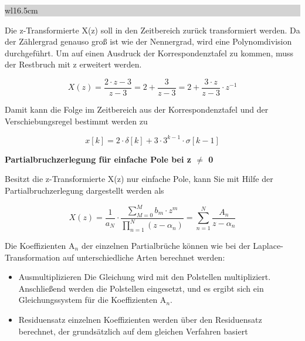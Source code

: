\noindent
\colorbox{lightgray}{%
%
\renewcommand\arraystretch{0.6}%
\begin{tabular}{ wl{16.5cm} }
{}
\end{tabular}%
}\medskip

\noindent Die z-Transformierte X(z) soll in den Zeitbereich zur\"{u}ck transformiert werden. Da der Z\"{a}hlergrad genauso gro{\ss} ist wie der Nennergrad, wird eine Polynomdivision durchgef\"{u}hrt. Um auf einen Ausdruck der Korrespondenztafel zu kommen, muss der Restbruch mit z erweitert werden.

\begin{equation}\label{eq:fiveeightynine}
X\left(z\right)=\frac{2\cdot z-3}{z-3} =2+\frac{3}{z-3} =2+\frac{3\cdot z}{z-3} \cdot z^{-1}
\end{equation}

\noindent Damit kann die Folge im Zeitbereich aus der Korrespondenztafel und der Verschiebungsregel bestimmt werden zu

\begin{equation}\label{eq:fiveninety}
x\left[k\right]=2\cdot \delta \left[k\right]+3\cdot 3^{k-1} \cdot \sigma \left[k-1\right]
\end{equation}

\clearpage

{\selectfont
\noindent\textbf{Partialbruchzerlegung f\"{u}r einfache Pole bei z $\boldsymbol{\mathrm{\neq}}$ 0}}\smallskip

\noindent Besitzt die z-Transformierte X(z) nur einfache Pole, kann Sie mit Hilfe der Partialbruchzerlegung dargestellt werden als

\begin{equation}\label{eq:fiveninetyone}
X\left(z\right)=\frac{1}{a_{N} } \cdot \frac{\sum _{M=0}^{M}b_{m} \cdot z^{m}  }{\prod _{n=1}^{N}\left(z-\alpha _{n} \right) } =\sum _{n=1}^{N}\frac{A_{n} }{z-\alpha _{n} }
\end{equation}

\noindent Die Koeffizienten A${}_{n}$ der einzelnen Partialbr\"{u}che k\"{o}nnen wie bei der Laplace-Transformation auf unterschiedliche Arten berechnet werden:

\begin{itemize}
    \item Ausmultiplizieren \newline
    Die Gleichung wird mit den Polstellen multipliziert. Anschlie{\ss}end werden die Polstellen eingesetzt, und es ergibt sich ein Gleichungssystem f\"{u}r die Koeffizienten A${}_{n}$. 
    \item Residuensatz \newline
    einzelnen Koeffizienten werden \"{u}ber den Residuensatz berechnet, der grunds\"{a}tzlich auf dem gleichen Verfahren basiert
\end{itemize}

